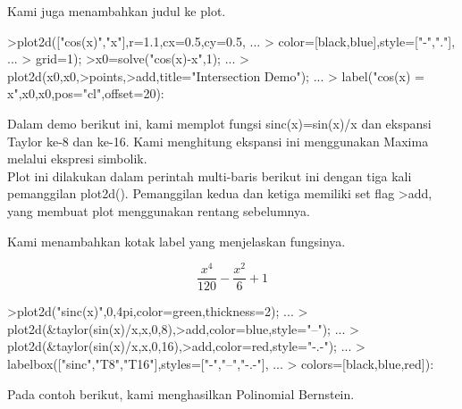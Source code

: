 \documentclass[12pt,Times new roman,letterpaper]{book}
\begin{document}
\begin{eulernootebook}
\begin{eulercomment}
\begin{eulercomment}
\begin{eulernootebook}
\begin{eulercomment}
\begin{eulercomment}
\begin{eulercomment}
\begin{eulercomment}
\begin{eulercomment}
\begin{eulercomment}
\begin{eulercomment}
\begin{eulernotebook}
\begin{eulercomment}
\begin{eulercomment}
\begin{eulercomment}
\begin{eulercomment}
\begin{eulercomment}
Kami juga menambahkan judul ke plot.
\end{eulercomment}
\begin{eulerprompt}
>plot2d(["cos(x)","x"],r=1.1,cx=0.5,cy=0.5, ...
>  color=[black,blue],style=["-","."], ...
>  grid=1);
>x0=solve("cos(x)-x",1);  ...
>  plot2d(x0,x0,>points,>add,title="Intersection Demo");  ...
>  label("cos(x) = x",x0,x0,pos="cl",offset=20):
\end{eulerprompt}
\begin{eulercomment}
Dalam demo berikut ini, kami memplot fungsi sinc(x)=sin(x)/x dan
ekspansi Taylor ke-8 dan ke-16. Kami menghitung ekspansi ini
menggunakan Maxima melalui ekspresi simbolik.\\
Plot ini dilakukan dalam perintah multi-baris berikut ini dengan tiga
kali pemanggilan plot2d(). Pemanggilan kedua dan ketiga memiliki set
flag \textgreater{}add, yang membuat plot menggunakan rentang sebelumnya.

Kami menambahkan kotak label yang menjelaskan fungsinya.
\end{eulercomment}
\begin{eulerformula}
\[
\frac{x^4}{120}-\frac{x^2}{6}+1
\]
\end{eulerformula}
\begin{eulerprompt}
>plot2d("sinc(x)",0,4pi,color=green,thickness=2); ...
>  plot2d(&taylor(sin(x)/x,x,0,8),>add,color=blue,style="--"); ...
>  plot2d(&taylor(sin(x)/x,x,0,16),>add,color=red,style="-.-"); ...
>  labelbox(["sinc","T8","T16"],styles=["-","--","-.-"], ...
>    colors=[black,blue,red]):
\end{eulerprompt}
\begin{eulercomment}
Pada contoh berikut, kami menghasilkan Polinomial Bernstein.


\end{eulercomment}
\end{eulercomment}
\end{eulercomment}
\end{eulercomment}
\end{eulercomment}
\end{eulernotebook}
\end{eulercomment}
\end{eulercomment}
\end{eulercomment}
\end{eulercomment}
\end{eulercomment}
\end{eulercomment}
\end{eulercomment}
\end{eulernootebook}
\end{eulercomment}
\end{eulercomment}
\end{eulernootebook}
\end{document}
